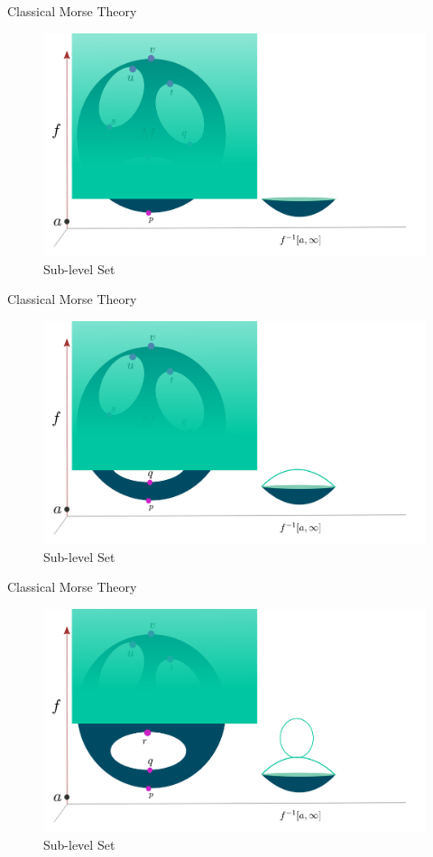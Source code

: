 \documentclass[9pt,sans-serif]{beamer}
\begin{document}
\begin{frame}{Classical Morse Theory}  
  \begin{figure}
    \centering
    \includegraphics[scale=0.2]{2}
    \caption{Sub-level Set}
  \end{figure}
\end{frame}

\begin{frame}{Classical Morse Theory}
  \begin{figure}
    \centering
    \includegraphics[scale=0.2]{3}
    \caption{Sub-level Set}
  \end{figure}
\end{frame}

\begin{frame}{Classical Morse Theory}
  \begin{figure}
    \centering
    \includegraphics[scale=0.2]{4}
    \caption{Sub-level Set}
  \end{figure}
\end{frame}
\end{document}
